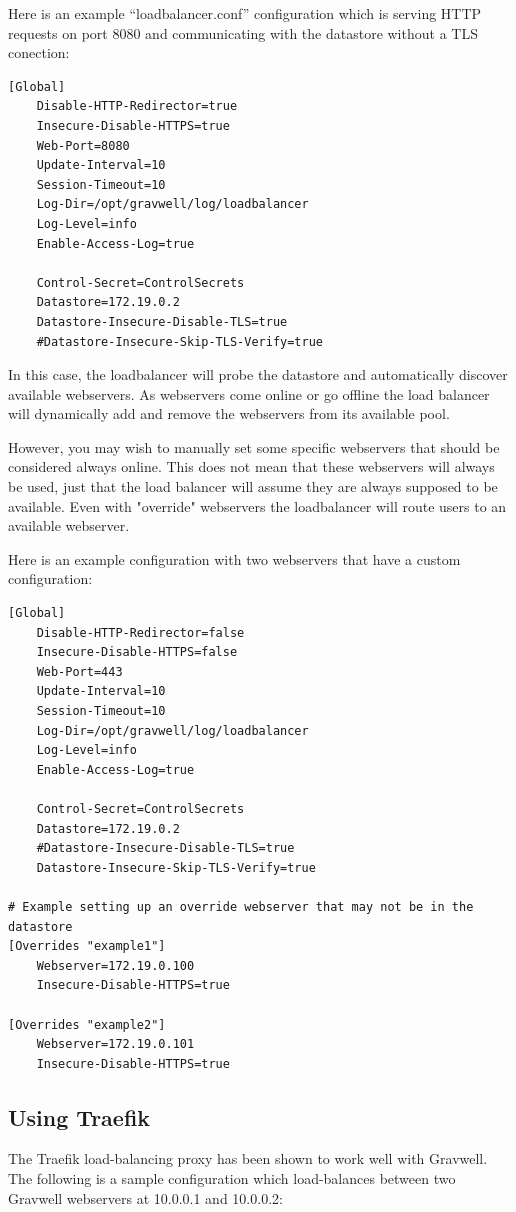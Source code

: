 Here is an example ``loadbalancer.conf'' configuration which is serving
HTTP requests on port 8080 and communicating with the datastore without
a TLS conection:


\begin{Verbatim}[breaklines=true]
[Global]
	Disable-HTTP-Redirector=true
	Insecure-Disable-HTTPS=true
	Web-Port=8080
	Update-Interval=10
	Session-Timeout=10
	Log-Dir=/opt/gravwell/log/loadbalancer
	Log-Level=info
	Enable-Access-Log=true

	Control-Secret=ControlSecrets
	Datastore=172.19.0.2
	Datastore-Insecure-Disable-TLS=true
	#Datastore-Insecure-Skip-TLS-Verify=true
\end{Verbatim}

In this case, the loadbalancer will probe the datastore and automatically
discover available webservers.  As webservers come online or go offline
the load balancer will dynamically add and remove the webservers from its
available pool.

However, you may wish to manually set some specific webservers that should
be considered always online.  This does not mean that these webservers will
always be used, just that the load balancer will assume they are always
supposed to be available.  Even with "override" webservers the loadbalancer
will route users to an available webserver.

Here is an example configuration with two webservers that have a custom configuration:

\begin{Verbatim}[breaklines=true]
[Global]
	Disable-HTTP-Redirector=false
	Insecure-Disable-HTTPS=false
	Web-Port=443
	Update-Interval=10
	Session-Timeout=10
	Log-Dir=/opt/gravwell/log/loadbalancer
	Log-Level=info
	Enable-Access-Log=true

	Control-Secret=ControlSecrets
	Datastore=172.19.0.2
	#Datastore-Insecure-Disable-TLS=true
	Datastore-Insecure-Skip-TLS-Verify=true

# Example setting up an override webserver that may not be in the datastore
[Overrides "example1"]
	Webserver=172.19.0.100
	Insecure-Disable-HTTPS=true

[Overrides "example2"]
	Webserver=172.19.0.101
	Insecure-Disable-HTTPS=true
\end{Verbatim}

\subsection{Using Traefik}
The Traefik load-balancing proxy has been shown to work well with
Gravwell. The following is a sample configuration which load-balances
between two Gravwell webservers at 10.0.0.1 and 10.0.0.2:

